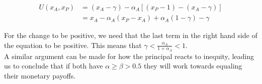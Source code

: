 \documentclass[12pt]{article}
\begin{document}
 \begin{equation*}
\begin{split}
 U\left(x_A,x_P \right) & = \left(x_A - \gamma \right) - \alpha_A \left[\left(x_P - 1\right)-\left(x_A - \gamma\right)\right] \\
& = x_A - \alpha_A \left(x_P - x_A\right)+\alpha_A \left(1-\gamma\right) - \gamma
\end{split}
\end{equation*}

For the change to be positive, we need that the last term in the right hand side of the equation to be positive. This means that $\gamma < \frac{\alpha_A}{1+\alpha_A} < 1$. 
\\

A similar argument can be made for how the principal reacts to inequity, leading us to conclude that if both have $\alpha \geq \beta > 0.5$ they will work towards equaling their monetary payoffs.

\end{document}
